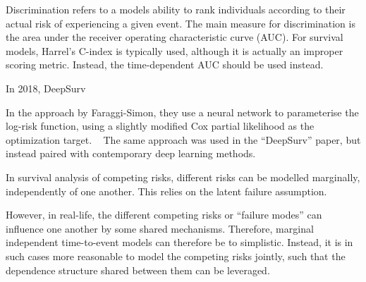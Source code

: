 Discrimination refers to a models ability to rank individuals according 
to their actual risk of experiencing a given event.
The main measure for discrimination is the area under the receiver
operating characteristic curve (AUC).
For survival models, Harrel's C-index is typically used,
although it is actually an improper scoring metric.
Instead, the time-dependent AUC should be used instead.


In 2018, DeepSurv 

In the approach by Faraggi-Simon, they use a neural network to 
parameterise the log-risk function, using a slightly modified Cox partial 
likelihood as the optimization target.
~\autocite{faraggiNeural1995}
The same approach was used in the \enquote{DeepSurv} paper,
but instead paired with contemporary deep learning methods.
~\autocite{katzmanDeepSurv2018a}





In survival analysis of competing risks, 
different risks can be modelled marginally,
independently of one another.
This relies on the latent failure assumption.

However, in real-life, the different competing risks 
or \enquote{failure modes} can influence one another
by some shared mechanisms.
Therefore, marginal independent time-to-event models
can therefore be to simplistic.
Instead, it is in such cases
more reasonable to model the competing risks jointly,
such that the dependence structure shared between them
can be leveraged.


